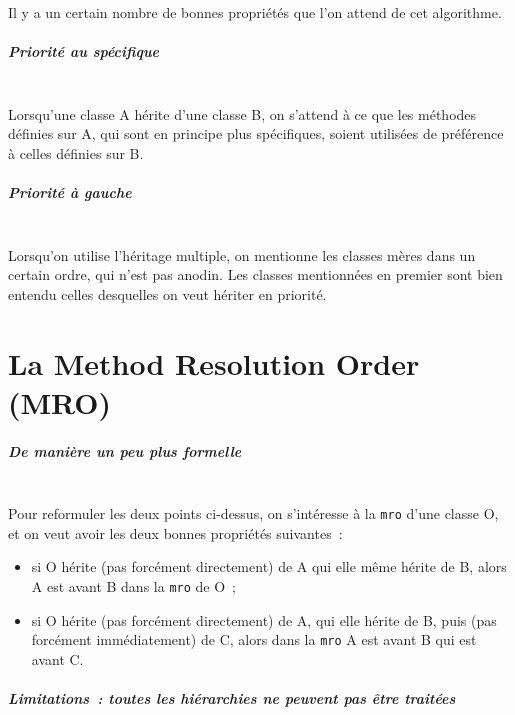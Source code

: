     Il y a un certain nombre de bonnes propriétés que l'on attend de cet
algorithme.

    \hypertarget{priorituxe9-au-spuxe9cifique}{%
\subparagraph{Priorité au
spécifique\\\\}\label{priorituxe9-au-spuxe9cifique}}

    Lorsqu'une classe A hérite d'une classe B, on s'attend à ce que les
méthodes définies sur A, qui sont en principe plus spécifiques, soient
utilisées de préférence à celles définies sur B.

    \hypertarget{priorituxe9-uxe0-gauche}{%
\subparagraph{Priorité à gauche\\\\}\label{priorituxe9-uxe0-gauche}}

    Lorsqu'on utilise l'héritage multiple, on mentionne les classes mères
dans un certain ordre, qui n'est pas anodin. Les classes mentionnées en
premier sont bien entendu celles desquelles on veut hériter en priorité.

    \hypertarget{la-method-resolution-order-mro}{%
\section{La Method Resolution Order
(MRO)}\label{la-method-resolution-order-mro}}

    \hypertarget{de-maniuxe8re-un-peu-plus-formelle}{%
\subparagraph{De manière un peu plus
formelle\\\\}\label{de-maniuxe8re-un-peu-plus-formelle}}

    Pour reformuler les deux points ci-dessus, on s'intéresse à la
\texttt{mro} d'une classe O, et on veut avoir les deux bonnes propriétés
suivantes~:

\begin{itemize}
\tightlist
\item
  si O hérite (pas forcément directement) de A qui elle même hérite de
  B, alors A est avant B dans la \texttt{mro} de O~;
\item
  si O hérite (pas forcément directement) de A, qui elle hérite de B,
  puis (pas forcément immédiatement) de C, alors dans la \texttt{mro} A
  est avant B qui est avant C.
\end{itemize}

    \hypertarget{limitations-toutes-les-hiuxe9rarchies-ne-peuvent-pas-uxeatre-traituxe9es}{%
\subparagraph{Limitations~: toutes les hiérarchies ne peuvent pas être
traitées\\\\}\label{limitations-toutes-les-hiuxe9rarchies-ne-peuvent-pas-uxeatre-traituxe9es}}

